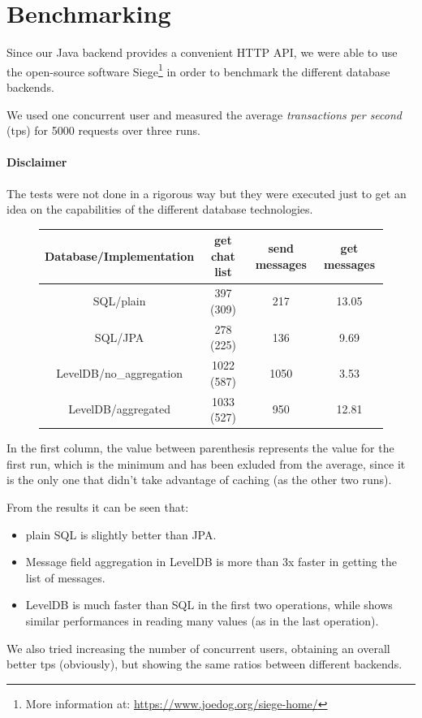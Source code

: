 \documentclass[10pt]{article}
\begin{document}
\section{Benchmarking}
\label{sec:bench}
Since our Java backend provides a convenient HTTP API, we were able to use 
the open-source software Siege\footnote{More information at: 
\url{https://www.joedog.org/siege-home/}} in order to benchmark the different 
database backends. 

We used one concurrent user and measured the average \emph{transactions per second} (tps) for 
5000 requests over three runs.

\paragraph{Disclaimer} 
The tests were not done in a rigorous way but they were executed just to get an 
idea on the capabilities of the different database technologies. 

\begin{figure}[h!]
    \centering
    \begin{tabular}{ | c | c | c | c |}
        \hline
        \textbf{Database/Implementation} & get chat list & send messages & get messages \\\hline
        SQL/plain & 397 (309) & 217 & 13.05 \\\hline
        SQL/JPA & 278 (225) & 136 & 9.69 \\\hline
        LevelDB/no\_aggregation & 1022 (587) & 1050 & 3.53 \\\hline
        LevelDB/aggregated & 1033 (527) & 950 & 12.81 \\\hline
    \end{tabular}
\end{figure}

In the first column, the value between parenthesis represents the value 
for the first run, which is the minimum and has been exluded from the average, 
since it is the only one that didn't take advantage of caching (as the other two runs).

From the results it can be seen that:
\begin{itemize}
    \item plain SQL is slightly better than JPA.
    \item Message field aggregation in LevelDB is more than 3x faster in getting 
            the list of messages.
    \item LevelDB is much faster than SQL in the first two operations, while shows
            similar performances in reading many values (as in the last operation).
\end{itemize}

We also tried increasing the number of concurrent users, obtaining an overall 
better tps (obviously), but showing the same ratios between different backends.
\end{document}
